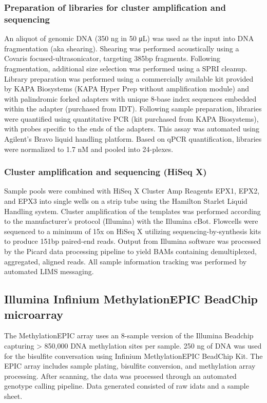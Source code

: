 \subsubsection{Preparation of libraries for cluster amplification and sequencing}
An aliquot of genomic DNA (350 ng in 50 μL) was used as the input into DNA fragmentation (aka shearing). Shearing was performed acoustically using a Covaris focused-ultrasonicator, targeting 385bp fragments. Following fragmentation, additional size selection was performed using a SPRI cleanup. Library preparation was performed using a commercially available kit provided by KAPA Biosystems (KAPA Hyper Prep without amplification module) and with palindromic forked adapters with unique 8-base index sequences embedded within the adapter (purchased from IDT). Following sample preparation, libraries were quantified using quantitative PCR (kit purchased from KAPA Biosystems), with probes specific to the ends of the adapters. This assay was automated using Agilent’s Bravo liquid handling platform. Based on qPCR quantification, libraries were normalized to 1.7 nM and pooled into 24-plexes.

\subsubsection{Cluster amplification and sequencing (HiSeq X)}
Sample pools were combined with HiSeq X Cluster Amp Reagents EPX1, EPX2, and EPX3 into single wells on a strip tube using the Hamilton Starlet Liquid Handling system. Cluster amplification of the templates was performed according to the manufacturer’s protocol (Illumina) with the Illumina cBot. Flowcells were sequenced to a minimum of 15x on HiSeq X utilizing sequencing-by-synthesis kits to produce 151bp paired-end reads. Output from Illumina software was processed by the Picard data processing pipeline to yield BAMs containing demultiplexed, aggregated, aligned reads. All sample information tracking was performed by automated LIMS messaging.


\subsection{Illumina Infinium MethylationEPIC BeadChip microarray}
The MethylationEPIC array uses an 8-sample version of the Illumina Beadchip capturing > 850,000 DNA methylation sites per sample. 250 ng of DNA was used for the bisulfite conversation using Infinium MethylationEPIC BeadChip Kit. The EPIC array includes sample plating, bisulfite conversion, and methylation array processing. After scanning, the data was processed through an automated genotype calling pipeline. Data generated consisted of raw idats and a sample sheet.


